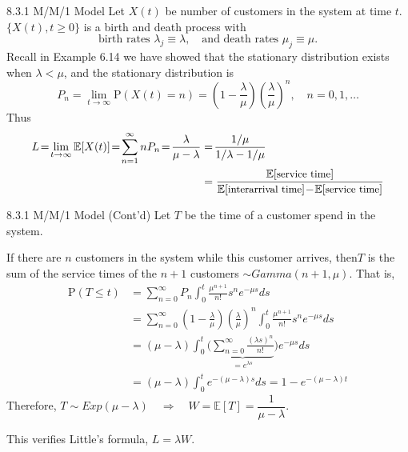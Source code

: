 \documentclass[letterpaper,handout]{beamer}
\def\Sum{\sum\nolimits}
\def\p{\mathrm P}
\def\E{\mathbb E}
\begin{document}
\begin{frame}{8.3.1 M/M/1 Model}
Let $X(t)$ be number of customers in the system at time $t$.
$\{X(t), t \ge 0\}$ is a birth and death process with
$$\text{birth rates }\lambda_j\equiv \lambda,\quad\text{and death rates }\mu_j\equiv \mu.$$
Recall in Example 6.14 we have showed that the stationary distribution exists when $\lambda<\mu$, and the stationary distribution is
$$
P_n=\lim_{t\to\infty}\p(X(t)=n)=\left(1-\frac{\lambda}{\mu}\right)\left(\frac{\lambda}{\mu}\right)^n,\quad n=0,1,\ldots
$$
Thus
\begin{align*}
L\!=\!\lim_{t\to\infty}\E[X(t)]\!=\!\sum_{n=1}^{\infty}nP_n\!=\!\frac{\lambda}{\mu-\lambda}&=\!\frac{1/\mu}{1/\lambda-1/\mu}\\
&=\frac{\E[\text{\small service time}]}{\E[\text{\small interarrival time}]\!-\!\E[\text{\small service time}]}
\end{align*}

\end{frame}
\begin{frame}{8.3.1 M/M/1 Model (Cont'd)}
Let $T$ be the time of a customer spend in the system. \par
If there are $n$ customers in the system while this customer arrives,
then$T$ is the sum of the service times of the $n+1$ customers $\sim Gamma(n+1,\mu).$
That is,
\begin{align*}
\p(T\le t)&=\Sum_{n=0}^{\infty}P_n\int_0^t\frac{\mu^{n+1}}{n!}s^ne^{-\mu s}ds\\
&=\Sum_{n=0}^{\infty}\left(1-\frac{\lambda}{\mu}\right)\left(\frac{\lambda}{\mu}\right)^n\int_0^t\frac{\mu^{n+1}}{n!}s^ne^{-\mu s}ds\\
&=(\mu-\lambda)\int_0^t\bigg(\underbrace{\Sum_{n=0}^{\infty}\frac{(\lambda s)^{n}}{n!}}_{=e^{\lambda s}}\bigg)e^{-\mu s}ds\\[-3pt]
&=(\mu-\lambda)\int_0^t e^{-(\mu-\lambda)s}ds=1-e^{-(\mu-\lambda)t}
\end{align*}
Therefore,
$T\sim Exp(\mu-\lambda)\quad \Rightarrow\quad W=\E[T]=\dfrac{1}{\mu-\lambda}.$\par
This verifies Little's formula, $L=\lambda W.$
\end{frame}
\end{document}
